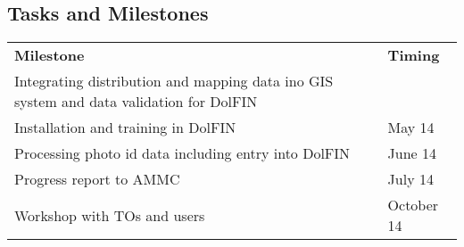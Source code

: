 \documentclass[version=last,
    paper=a4,                               %
    10pt,                                   %
    dvipsnames,
    oneside,                              %
    headings=openany,                       %
    open=any,
    BCOR=7mm,                               %
    DIV=15,     %
]{scrbook}
\begin{document}
\subsection*{Tasks and Milestones}

\begin{longtable}[c]{@{}ll@{}}
\toprule\addlinespace
\begin{minipage}[t]{0.47\columnwidth}\raggedright
\textbf{Milestone}
\end{minipage} & \begin{minipage}[t]{0.47\columnwidth}\raggedright
\textbf{Timing}
\end{minipage}
\\\addlinespace
\begin{minipage}[t]{0.47\columnwidth}\raggedright
Integrating distribution and mapping data ino GIS system and data
validation for DolFIN
\end{minipage} & \begin{minipage}[t]{0.47\columnwidth}\raggedright
~
\end{minipage}
\\\addlinespace
\begin{minipage}[t]{0.47\columnwidth}\raggedright
Installation and training in DolFIN
\end{minipage} & \begin{minipage}[t]{0.47\columnwidth}\raggedright
May 14
\end{minipage}
\\\addlinespace
\begin{minipage}[t]{0.47\columnwidth}\raggedright
Processing photo id data including entry into DolFIN
\end{minipage} & \begin{minipage}[t]{0.47\columnwidth}\raggedright
June 14
\end{minipage}
\\\addlinespace
\begin{minipage}[t]{0.47\columnwidth}\raggedright
Progress report to AMMC
\end{minipage} & \begin{minipage}[t]{0.47\columnwidth}\raggedright
July 14
\end{minipage}
\\\addlinespace
\begin{minipage}[t]{0.47\columnwidth}\raggedright
Workshop with TOs and users
\end{minipage} & \begin{minipage}[t]{0.47\columnwidth}\raggedright
October 14

\end{minipage}
\end{longtable}
\end{document}
